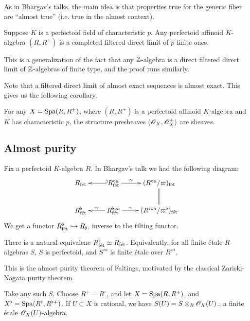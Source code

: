 As in Bhargav's talks, the main idea is that properties true for the generic fiber 
are ``almost true'' (i.e. true in the almost context). 

\begin{proposition}
Suppose $K$ is a perfectoid field of characteristic $p$. Any perfectoid affinoid 
$K$-algebra $(R,R^+)$ is a completed filtered direct limit of $p$-finite ones. 
\end{proposition}

This is a generalization of the fact that any $\mathbb{Z}$-algebra is a direct filtered 
direct limit of $\mathbb{Z}$-algebras of finite type, and the proof runs similarly. 

Note that a filtered direct limit of almost exact sequences is almost exact. This 
gives us the following corollary. 

\begin{corollary}
For any $X=\operatorname{Spa}(R,R^+)$, where $(R,R^+)$ is a perfectoid affinoid $K$-algebra and 
$K$ has characteristic $p$, the structure presheaves $(\mathscr{O}_X,\mathscr{O}_X^+)$ are 
sheaves. 
\end{corollary}





\subsection{Almost purity}

Fix a perfectoid $K$-algebra $R$. In Bhargav's talk we had the following diagram:
\[\xymatrix{
  R_\fet 
    & R^{\circ a}_\fet \ar@{_{(}->}[l] \ar[r]^-\sim 
    &  (R^{\circ a}/\varpi)_\fet \ar@{=}[d] \\
  R^\flat_\fet 
    & \ar[l]_-\sim R_\fet^{\flat\circ a} \ar[r]^-\sim 
    & (R^{\flat\circ a}/\varpi^\flat)_\fet
}\]
We get a functor $R_{\textnormal{f\'et}}^\flat \hookrightarrow R_\flat$, inverse to the tilting 
functor. 

\begin{theorem}
There is a natural equivalene $R_{\textnormal{f\'et}}^\flat\simeq R_{\textnormal{f\'et}}$. Equivalently, for all 
finite \'etale $R$-algebras $S$, $S$ is perfectoid, and $S^{\circ a}$ is 
finite \'etale over $R^{\circ a}$. 
\end{theorem}

This is the almost purity theorem of Faltings, motivated by the classical 
Zariski-Nagata purity theorem. 

Take any such $S$. Choose $R^+=R^\circ$, and let $X=\operatorname{Spa}(R,R^+)$, and 
$X^\flat = \operatorname{Spa}(R^\flat,R^{\flat +})$. If $U\subset X$ is rational, we have 
$S(U) = S\otimes_R \mathscr{O}_X(U)$., a finite \'etale $\mathscr{O}_X(U)$-algebra. 

